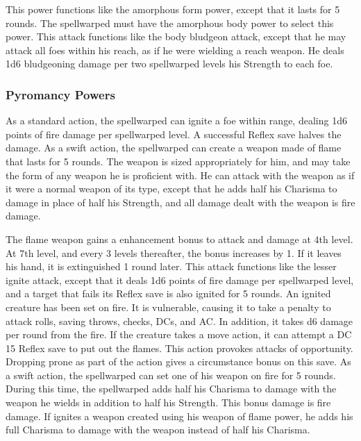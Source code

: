  This power functions like the amorphous form power, except that it lasts for 5 rounds. The spellwarped must have the amorphous body power to select this power.
 This attack functions like the body bludgeon attack, except that he may attack all foes within his reach, as if he were wielding a reach weapon. He deals 1d6 bludgeoning damage per two spellwarped levels \add his Strength to each foe.

\subsubsection{Pyromancy Powers}
 As a standard action, the spellwarped can ignite a foe within \rngclose range, dealing 1d6 points of fire damage  per spellwarped level. A successful Reflex save halves the damage.
 As a swift action, the spellwarped can create a weapon made of flame that lasts for 5 rounds. The weapon is sized appropriately for him, and may take the form of any weapon he is proficient with. He can attack with the weapon as if it were a normal weapon of its type, except that he adds half his Charisma to damage in place of half his Strength, and all damage dealt with the weapon is fire damage.
\par The flame weapon gains a  enhancement bonus to attack and damage at 4th level. At 7th level, and every 3 levels thereafter, the bonus increases by 1. If it leaves his hand, it is extinguished 1 round later.
 This attack functions like the lesser ignite attack, except that it deals 1d6 points of fire damage per spellwarped level, and a target that fails its Reflex save is also ignited for 5 rounds. An ignited creature has been set on fire. It is vulnerable, causing it to take a  penalty to attack rolls, saving throws, checks, DCs, and AC. In addition, it takes d6 damage per round from the fire. If the creature takes a move action, it can attempt a DC 15 Reflex save to put out the flames. This action provokes attacks of opportunity. Dropping prone as part of the action gives a  circumstance bonus on this save.
 As a swift action, the spellwarped can set one of his weapon on fire for 5 rounds. During this time, the spellwarped adds half his Charisma to damage with the weapon he wields in addition to half his Strength. This bonus damage is fire damage. If ignites a weapon created using his weapon of flame power, he adds his full Charisma to damage with the weapon instead of half his Charisma.
